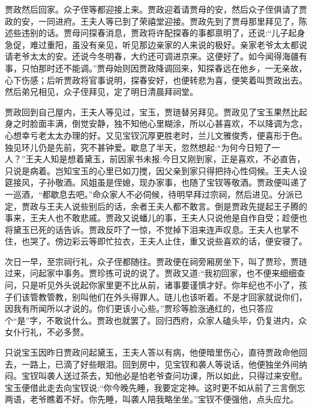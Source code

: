 \begin{parag}
    贾政然后回家。众子侄等都迎接上来。贾政迎着请贾母的安，然后众子侄俱请了贾政的安，一同进府。王夫人等已到了荣禧堂迎接。贾政先到了贾母那里拜见了，陈述些违别的话。贾母问探春消息，贾政将许配探春的事都禀明了，还说:“儿子起身急促，难过重阳，虽没有亲见，听见那边亲家的人来说的极好。亲家老爷太太都说请老爷太太的安。还说今冬明春，大约还可调进京来。这便好了。如今闻得海疆有事，只怕那时还不能调。”贾母始则因贾政降调回来，知探春远在他乡，一无亲故，心下伤感；后听贾政将官事说明，探春安好，也便转悲为喜，便笑着叫贾政出去。然后弟兄相见，众子侄拜见，定了明日清晨拜祠堂。
\end{parag}


\begin{parag}
    贾政回到自己屋内，王夫人等见过，宝玉，贾琏替另拜见。贾政见了宝玉果然比起身之时脸面丰满，倒觉安静，独不知他心里糊涂，所以心甚喜欢，不以降调为念，心想幸亏老太太办理的好。又见宝钗沉厚更胜老时，兰儿文雅俊秀，便喜形于色。独见环儿仍是先前，究不甚钟爱。歇息了半天，忽然想起:“为何今日短了一人？”王夫人知是想着黛玉，前因家书未报:今日又刚到家，正是喜欢，不必直告，只说是病着。岂知宝玉的心里已如刀搅，因父亲到家只得把持心性伺候。王夫人设筵接风，子孙敬酒。风姐虽是侄媳，现办家事，也随了宝钗等敬酒。贾政便叫递了一巡酒，“都歇息去吧。”命众家人不必伺候，待明早拜过宗祠，然后进见。分派已定，贾政与王夫人说些别后的话，余者王夫人都不敢言。倒是贾政先提起王子腾的事来，王夫人也不敢悲戚。贾政又说蟠儿的事，王夫人只说他是自作自受；趁便也将黛玉已死的话告诉。贾政反吓了一惊，不觉掉下泪来连声叹息。王夫人也掌不住，也哭了。傍边彩云等即忙拉衣，王夫人止住，重又说些喜欢的话，便安寝了。
\end{parag}


\begin{parag}
    次日一早，至宗祠行礼，众子侄都随往。贾政便在祠旁厢房坐下，叫了贾珍，贾琏过来，问起家中事务。贾珍拣可说的说了。贾政又道:“我初回家，也不便来细细查问，只是听见外头说起你家里更不比从前，诸事要谨慎才好。你年纪也不小了，孩子们该管教管教，别叫他们在外头得罪人。琏儿也该听着。不是才回家就说你们，因我有所闻所以才说的。你们更该小心些。”贾珍等脸涨通红的，也只答应个“是”字，不敢说什么。贾政也就罢了。回归西府，众家人磕头毕，仍复进内，众女仆行礼，不必多赘。
\end{parag}


\begin{parag}
    只说宝玉因昨日贾政问起黛玉，王夫人答以有病，他便暗里伤心，直待贾政命他回去，一路上，已滴了好些眼泪。回到房中，见宝钗和袭人等说话，他便独坐外间纳闷。宝钗叫袭人送过茶去，知他必是怕老爷查问功课，所以如此，只得过来安慰。宝玉便借此走去向宝钗说:“你今晚先睡，我要定定神。这时更不如从前了三言倒忘两语，老爷瞧着不好。你先睡，叫袭人陪我略坐坐。”宝钗不便强他，点头应允。
\end{parag}



